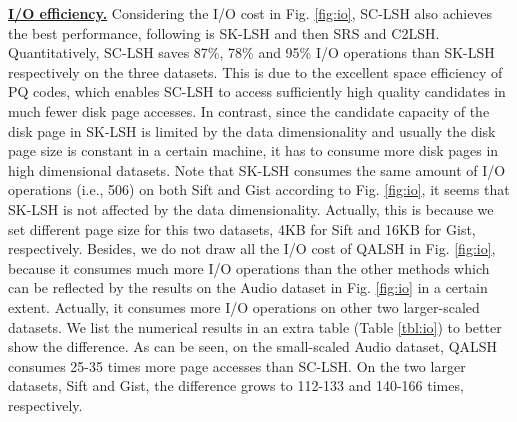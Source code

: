 \documentclass[twocolumn]{svjour3}          %
\newcommand{\btitle}[1]{\vspace{1ex}\noindent\underline{\textbf{#1}}}
\begin{document}
\noindent\btitle{I/O efficiency.} Considering the I/O cost in Fig. \ref{fig:io}, SC-LSH also achieves the best performance, following is SK-LSH and then SRS and C2LSH. Quantitatively, SC-LSH saves 87\%, 78\% and 95\% I/O operations than SK-LSH respectively on the three datasets. 
This is due to the excellent space efficiency of PQ codes, which enables SC-LSH to access sufficiently high quality candidates in much fewer disk page accesses.
In contrast, since the candidate capacity of the disk page in SK-LSH is limited by the data dimensionality and usually the disk page size is constant in a certain machine, it has to consume more disk pages in high dimensional datasets. Note that SK-LSH consumes the same amount of I/O operations (i.e., 506) on both Sift and Gist according to Fig. \ref{fig:io}, it seems that SK-LSH is not affected by the data dimensionality. Actually, this is because we set different page size for this two datasets, 4KB for Sift and 16KB for Gist, respectively.
Besides, we do not draw all the I/O cost of QALSH in Fig. \ref{fig:io}, because it consumes much more I/O operations than the other methods which can be reflected by the results on the Audio dataset in Fig. \ref{fig:io} in a certain extent. Actually, it consumes more I/O operations on other two larger-scaled datasets. We list the numerical results in an extra table (Table \ref{tbl:io}) to better show the difference. As can be seen, on the small-scaled Audio dataset, QALSH consumes 25-35 times more page accesses than SC-LSH. On the two larger datasets, Sift and Gist, the difference grows to 112-133 and 140-166 times, respectively.
\end{document}
